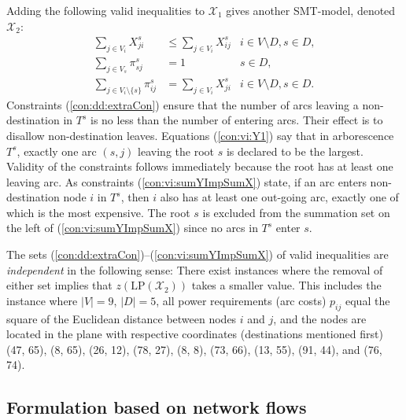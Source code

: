Adding the following valid inequalities to $\mathcal{X}_1$ gives another SMT-model, denoted $\mathcal{X}_2$:
\begin{subequations}[resume]
\begin{align}
\label{con:dd:extraCon} \sum\limits_{j\in V_{i}}X^s_{ji} & \leq \sum\limits_{j\in V_{i}}X^s_{ij}  & 	i\in V\setminus D, s\in D,\\
\label{con:vi:Y1} \sum\limits_{j\in V_s}  \pi^{s}_{sj} & =1 & s\in D,\\
\label{con:vi:sumYImpSumX} \sum\limits_{j\in V_i\setminus\{s\} }\pi^{s}_{ij} & = \sum\limits_{j\in V_i}  X^{s}_{ji} & i\in V\setminus D, s\in D.
\end{align}
\end{subequations}
Constraints (\ref{con:dd:extraCon}) ensure that the number of arcs leaving a non-destination in $T^s$ is no less than the number of entering arcs.
Their effect is to disallow non-destination leaves.
Equations (\ref{con:vi:Y1}) say that in arborescence $T^s$, exactly one arc $(s,j)$ leaving the root $s$ is declared to be the largest.
Validity of the constraints follows immediately because the root has at least one leaving arc.
As constraints (\ref{con:vi:sumYImpSumX}) state, if an arc enters non-destination node $i$ in $T^s$, then $i$ also has at least one out-going arc,
exactly one of which is the most expensive.
The root $s$ is excluded from the summation set on the left of (\ref{con:vi:sumYImpSumX}) since no arcs in $T^s$ enter $s$.

\begin{remark} \label{rem:x2}
The sets (\ref{con:dd:extraCon})--(\ref{con:vi:sumYImpSumX}) of valid inequalities are \emph{independent} in the following sense:
There exist instances where the removal of either set implies that $z(\text{LP}(\mathcal{X}_2))$ takes a smaller value.
This includes the instance where $|V|=9$, $|D|=5$, all power requirements (arc costs) $p_{ij}$ equal the square of the Euclidean distance between nodes $i$ and $j$,
and the nodes are located in the plane with respective coordinates (destinations mentioned first)
(47, 65), (8, 65), (26, 12), (78, 27), (8, 8), (73, 66), (13, 55), (91, 44), and (76, 74).
\end{remark}

\subsection{Formulation based on network flows}

